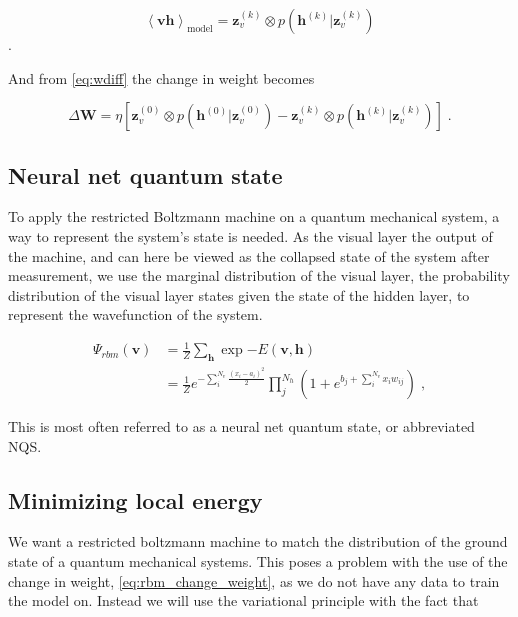 \begin{equation}
    \left < \boldsymbol{v} \boldsymbol{h} \right >_{\text{model}} = \boldsymbol{z}_v^{(k)} \otimes p(\boldsymbol{h}^{(k)} | \boldsymbol{z}_{v}^{(k)})
\end{equation} \; .

And from \ref{eq:wdiff} the change in weight becomes

\begin{equation}\label{eq:rbm_change_weight}
  \Delta \boldsymbol{W} = \eta \left [\boldsymbol{z}_v^{(0)} \otimes p(\boldsymbol{h}^{(0)} | \boldsymbol{z}_{v}^{(0)}) - \boldsymbol{z}_v^{(k)} \otimes p(\boldsymbol{h}^{(k)} | \boldsymbol{z}_{v}^{(k)}) \right ] \; .
\end{equation}
\subsection{Neural net quantum state}

To apply the restricted Boltzmann machine on a quantum mechanical system, a way to represent the system's state is needed. As the visual layer the output of the machine, and can here be viewed as the collapsed state of the system after measurement, we use the marginal distribution of the visual layer, the probability distribution of the visual layer states given the state of the hidden layer, to represent the wavefunction of the system.

\begin{align}
  \Psi_{rbm}(\boldsymbol{v}) &=\frac{1}{Z} \sum_{\boldsymbol{h}} \exp{-E(\boldsymbol{v}, \boldsymbol{h})} \\
                             &=\frac{1}{Z} e^{-\sum_i^{N_v} \frac{(x_i - a_i)^2}{2}} \prod_j^{ N_h } (1 + e^{b_j + \sum_i^{N_v} x_i w_{ij}})\; ,
  \label{eq:nqs_rbm}
\end{align}

This is most often referred to as a neural net quantum state, or abbreviated NQS.

\subsection{Minimizing local energy}

We want a restricted boltzmann machine to match the distribution of the ground state of a quantum mechanical systems. This poses a problem with the use of the change in weight, \ref{eq:rbm_change_weight}, as we do not have any data to train the model on. Instead we will use the variational principle with the fact that


